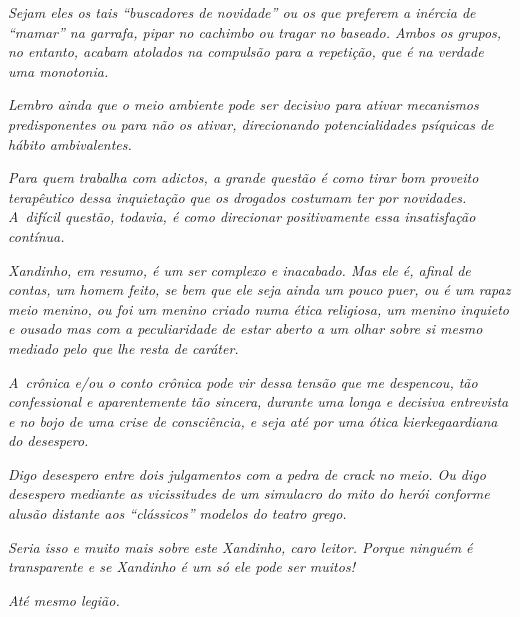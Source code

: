 \emph{Sejam eles os tais ``buscadores de novidade'' ou os que preferem a
inércia de ``mamar'' na garrafa, pipar no cachimbo ou tragar no baseado.
Ambos os grupos, no entanto, acabam atolados na compulsão para a
repetição, que é na verdade uma monotonia.}

\emph{Lembro ainda que o meio ambiente pode ser decisivo para ativar
mecanismos predisponentes ou para não os ativar, direcionando
potencialidades psíquicas de hábito ambivalentes.}

\emph{Para quem trabalha com adictos, a grande questão é como tirar bom
proveito terapêutico dessa inquietação que os drogados costumam ter por
novidades. A~difícil questão, todavia, é como direcionar positivamente
essa insatisfação contínua.}

\emph{Xandinho, em resumo, é um ser complexo e inacabado. Mas ele é,
afinal de contas, um homem feito, se bem que ele seja ainda um pouco
puer, ou é um rapaz meio menino, ou foi um menino criado numa ética
religiosa, um menino inquieto e ousado mas com a peculiaridade de estar
aberto a um olhar sobre si mesmo mediado pelo que lhe resta de
caráter.}

\emph{A~crônica e/ou o conto crônica pode vir dessa tensão que me
despencou, tão confessional e aparentemente tão sincera, durante uma
longa e decisiva entrevista e no bojo de uma crise de consciência, e
seja até por uma ótica kierkegaardiana do desespero.}

\emph{Digo desespero entre dois julgamentos com a pedra de crack no
meio. Ou digo desespero mediante as vicissitudes de um simulacro do mito
do herói conforme alusão distante aos ``clássicos'' modelos do teatro
grego.}

\emph{Seria isso e muito mais sobre este Xandinho, caro leitor. Porque
ninguém é transparente e se Xandinho é um só ele pode ser muitos!}

\emph{Até mesmo legião.~}
\endgroup
 

 

 
